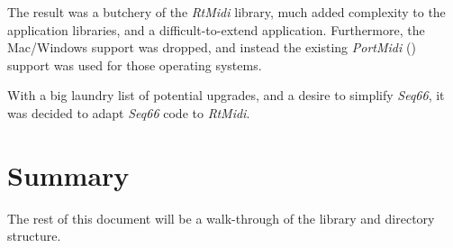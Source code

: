 \documentclass[
 11pt,
 twoside,
 a4paper,
 final                                 %
]{article}
\begin{document}
   The result was a butchery of the \textsl{RtMidi} library, much added
   complexity to the application libraries, and a difficult-to-extend
   application.  Furthermore, the Mac/Windows support was dropped, and
   instead the existing \textsl{PortMidi} (\cite{portmidi}) support was
   used for those operating systems.

   With a big laundry list of potential upgrades, and a desire to
   simplify \textsl{Seq66}, it was decided to adapt \textsl{Seq66} code
   to \textsl{RtMidi}.


\section{Summary}
\label{sec:summary}

   The rest of this document will be a walk-through of the library and
   directory structure.










\printindex
\end{document}
